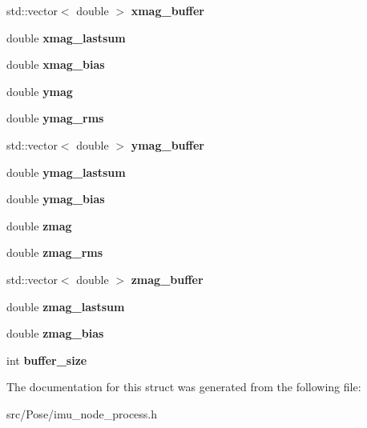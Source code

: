 \begin{DoxyCompactItemize}
std\+::vector$<$ double $>$ {\bfseries xmag\+\_\+buffer}
\item 
\mbox{\label{structIMUNodeProcess_1_1Sensor_a14f6ff5ad51330bde88bf7261429f007}} 
double {\bfseries xmag\+\_\+lastsum}
\item 
\mbox{\label{structIMUNodeProcess_1_1Sensor_a045ab58260c50d8bb3045cc3e3cdd550}} 
double {\bfseries xmag\+\_\+bias}
\item 
\mbox{\label{structIMUNodeProcess_1_1Sensor_a1b0c4ee07a86c2578ebb03e0592c553b}} 
double {\bfseries ymag}
\item 
\mbox{\label{structIMUNodeProcess_1_1Sensor_a2c9e135aa4a0e3b03e270828ef8a2d08}} 
double {\bfseries ymag\+\_\+rms}
\item 
\mbox{\label{structIMUNodeProcess_1_1Sensor_aa36af99929a7023aa1851a0038ce8c28}} 
std\+::vector$<$ double $>$ {\bfseries ymag\+\_\+buffer}
\item 
\mbox{\label{structIMUNodeProcess_1_1Sensor_a3454396c53fba81cbb9726fa0e699c35}} 
double {\bfseries ymag\+\_\+lastsum}
\item 
\mbox{\label{structIMUNodeProcess_1_1Sensor_af19249e9061ebf97dd98aa1c8824950c}} 
double {\bfseries ymag\+\_\+bias}
\item 
\mbox{\label{structIMUNodeProcess_1_1Sensor_ab8cbceb4f24e98da1eaee1dd2fca3cfd}} 
double {\bfseries zmag}
\item 
\mbox{\label{structIMUNodeProcess_1_1Sensor_aa548217cf9a023dda4d75c58b70dbeca}} 
double {\bfseries zmag\+\_\+rms}
\item 
\mbox{\label{structIMUNodeProcess_1_1Sensor_a41eeffae371590b9f348561fbe902d8f}} 
std\+::vector$<$ double $>$ {\bfseries zmag\+\_\+buffer}
\item 
\mbox{\label{structIMUNodeProcess_1_1Sensor_aa30007eed9d899c1ad0be16925e75d0a}} 
double {\bfseries zmag\+\_\+lastsum}
\item 
\mbox{\label{structIMUNodeProcess_1_1Sensor_aede2d4fca78d7df8dbac73bca40914f4}} 
double {\bfseries zmag\+\_\+bias}
\item 
\mbox{\label{structIMUNodeProcess_1_1Sensor_a948fe6dce96e1fc3fb457475381a91c9}} 
int {\bfseries buffer\+\_\+size}
\end{DoxyCompactItemize}


The documentation for this struct was generated from the following file\+:\begin{DoxyCompactItemize}
\item 
src/\+Pose/imu\+\_\+node\+\_\+process.\+h\end{DoxyCompactItemize}
